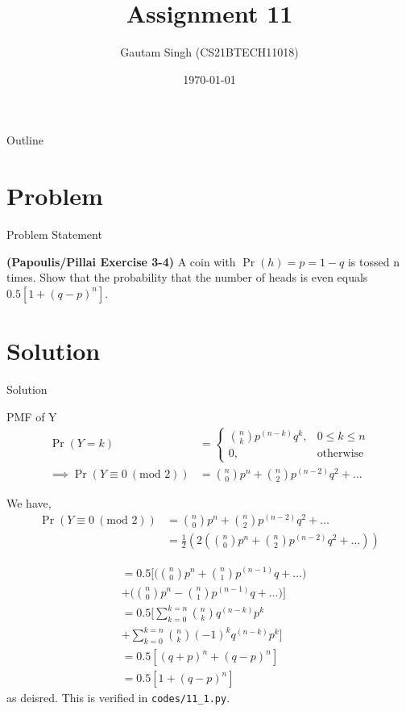 \documentclass{beamer}
\title{Assignment 11}
\author{Gautam Singh (CS21BTECH11018)}
\date{\today}
\providecommand{\pr}[1]{\ensuremath{\Pr\left(#1\right)}}
\begin{document}
\begin{frame}
    \titlepage 
\end{frame}

\begin{frame}{Outline}
    \tableofcontents
\end{frame}


\section{Problem}
\begin{frame}{Problem Statement}

\textbf{(Papoulis/Pillai Exercise 3-4)} A coin with $\pr{h} = p = 1 - q$ is tossed n times. Show that the probability that the number
of heads is even equals $0.5[1 + (q - p)^n]$. 

\end{frame}


\section{Solution}

\begin{frame}{Solution}
    \begin{alertblock}{PMF of Y}
        \begin{align}
            \pr{Y = k} &= 
            \begin{cases}
                \binom{n}{k}p^{(n - k)}q^k, & 0 \leq k \leq n \\
                0, & \textrm{otherwise} 
            \end{cases}  \\
            \implies \pr{Y \equiv 0\ (\textrm{mod } 2)} &= \binom{n}{0}p^n + \binom{n}{2}p^{(n - 2)}q^2 + \ldots
        \end{align}
    \end{alertblock}
	We have, 
	\begin{align}
		\pr{Y \equiv 0\ (\textrm{mod } 2)} &= \binom{n}{0}p^n + \binom{n}{2}p^{(n - 2)}q^2 + \ldots \\ 
		&= \frac{1}{2}(2(\binom{n}{0}p^n + \binom{n}{2}p^{(n - 2)}q^2 + \ldots))
	\end{align}
\end{frame}

\begin{frame}
    \begin{align}
		&= 0.5\bigg[ \bigg(\binom{n}{0}p^n + \binom{n}{1}p^{(n - 1)}q + \ldots\bigg) \nonumber \\
		&+\bigg( \binom{n}{0}p^n - \binom{n}{1}p^{(n - 1)}q + \ldots \bigg) \bigg] \\
		&= 0.5\bigg[ \sum_{k = 0}^{k = n}\binom{n}{k}q^{(n - k)}p^k \nonumber \\
		&+ \sum_{k = 0}^{k = n}\binom{n}{k}(-1)^kq^{(n - k)}p^k \bigg] \\
		&= 0.5[(q + p)^n + (q - p)^n] \\
		&= 0.5[1 + (q - p)^n]
        \label{eq:proof}
    \end{align}
    as deisred. This is verified in \texttt{codes/11\_1.py}.
\end{frame}
\end{document}
